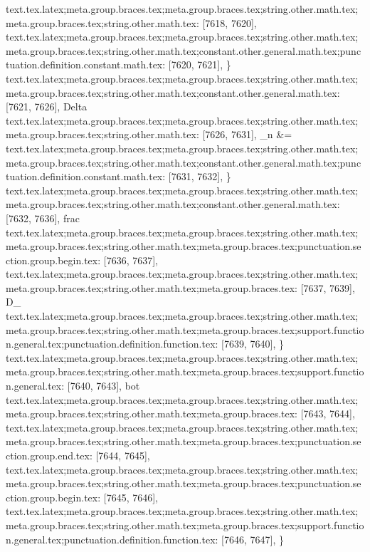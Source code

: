 {{{{{{{{{{{{{{{{{{{{{{{{{{{{{{{{{{{{{{{{{{{{{{{{{{{{{{{{{{{{{{{{{{{{{{{{{{{{{{{{{{{{{{{{{{{{{{{{{{{{{{{{{{{{{{{{{{{{{{{{{{{{{{{{{{{{{{{{{{{{{{{{{{{{{{{{{{{{{{{{{{{{{{{{{{{{{{{{{{{{{{{{{{{{{{{{{{{{{{{{{{{{{{{{{{{}
text.tex.latex;meta.group.braces.tex;meta.group.braces.tex;string.other.math.tex;meta.group.braces.tex;string.other.math.tex: [7618, 7620], {  }
text.tex.latex;meta.group.braces.tex;meta.group.braces.tex;string.other.math.tex;meta.group.braces.tex;string.other.math.tex;constant.other.general.math.tex;punctuation.definition.constant.math.tex: [7620, 7621], {\}
text.tex.latex;meta.group.braces.tex;meta.group.braces.tex;string.other.math.tex;meta.group.braces.tex;string.other.math.tex;constant.other.general.math.tex: [7621, 7626], {Delta}
text.tex.latex;meta.group.braces.tex;meta.group.braces.tex;string.other.math.tex;meta.group.braces.tex;string.other.math.tex: [7626, 7631], {_n &=}
text.tex.latex;meta.group.braces.tex;meta.group.braces.tex;string.other.math.tex;meta.group.braces.tex;string.other.math.tex;constant.other.general.math.tex;punctuation.definition.constant.math.tex: [7631, 7632], {\}
text.tex.latex;meta.group.braces.tex;meta.group.braces.tex;string.other.math.tex;meta.group.braces.tex;string.other.math.tex;constant.other.general.math.tex: [7632, 7636], {frac}
text.tex.latex;meta.group.braces.tex;meta.group.braces.tex;string.other.math.tex;meta.group.braces.tex;string.other.math.tex;meta.group.braces.tex;punctuation.section.group.begin.tex: [7636, 7637], {{}
text.tex.latex;meta.group.braces.tex;meta.group.braces.tex;string.other.math.tex;meta.group.braces.tex;string.other.math.tex;meta.group.braces.tex: [7637, 7639], {D_}
text.tex.latex;meta.group.braces.tex;meta.group.braces.tex;string.other.math.tex;meta.group.braces.tex;string.other.math.tex;meta.group.braces.tex;support.function.general.tex;punctuation.definition.function.tex: [7639, 7640], {\}
text.tex.latex;meta.group.braces.tex;meta.group.braces.tex;string.other.math.tex;meta.group.braces.tex;string.other.math.tex;meta.group.braces.tex;support.function.general.tex: [7640, 7643], {bot}
text.tex.latex;meta.group.braces.tex;meta.group.braces.tex;string.other.math.tex;meta.group.braces.tex;string.other.math.tex;meta.group.braces.tex: [7643, 7644], { }
text.tex.latex;meta.group.braces.tex;meta.group.braces.tex;string.other.math.tex;meta.group.braces.tex;string.other.math.tex;meta.group.braces.tex;punctuation.section.group.end.tex: [7644, 7645], {}}
text.tex.latex;meta.group.braces.tex;meta.group.braces.tex;string.other.math.tex;meta.group.braces.tex;string.other.math.tex;meta.group.braces.tex;punctuation.section.group.begin.tex: [7645, 7646], {{}
text.tex.latex;meta.group.braces.tex;meta.group.braces.tex;string.other.math.tex;meta.group.braces.tex;string.other.math.tex;meta.group.braces.tex;support.function.general.tex;punctuation.definition.function.tex: [7646, 7647], {\}
}}}}}}}}}}}}}}}}}}}}}}}}}}}}}}}}}}}}}}}}}}}}}}}}}}}}}}}}}}}}}}}}}}}}}}}}}}}}}}}}}}}}}}}}}}}}}}}}}}}}}}}}}}}}}}}}}}}}}}}}}}}}}}}}}}}}}}}}}}}}}}}}}}}}}}}}}}}}}}}}}}}}}}}}}}}}}}}}}}}}}}}}}}}}}}}}}}}}}}}}}}}}}}}}}}}}}}}

